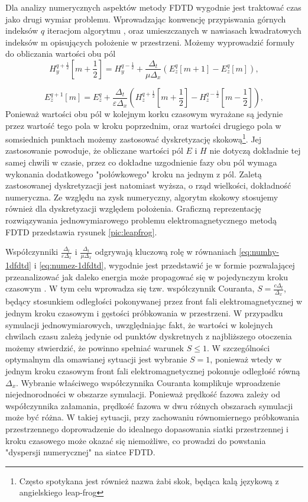 Dla analizy numerycznych aspektów metody FDTD wygodnie jest traktować czas jako drugi wymiar problemu. Wprowadzając konwencję przypiswania górnych indeksów $q$  iteracjom algorytmu , oraz umieszczanych w nawiasach kwadratowych indeksów m opisujących położenie w przestrzeni. Możemy wyprowadzić formuły do obliczania wartości obu pól
\begin{equation}
H_y^{q+\frac{1}{2}}[m+\frac{1}{2}]=H_y^{q-\frac{1}{2}}+\frac{\Delta_t}{\mu \Delta_x}(E^q_z[m+1]-E^q_z[m]),
\label{eq:numhy-1dfdtd}
\end{equation}

\begin{equation}
E_z^{q+1}[m]=E_z^{q}+\frac{\Delta_t}{\varepsilon \Delta_x}(H^{q+\frac{1}{2}}_z[m+\frac{1}{2}]-H^{q-\frac{1}{2}}_z[m-\frac{1}{2}]),
\label{eq:numez-1dfdtd}
\end{equation}
 Ponieważ wartości obu pól w kolejnym korku czasowym wyrażane są jedynie przez wartość tego pola w kroku poprzednim, oraz wartości drugiego pola w somsiednich punktach możemy zastosować dyskretyzację skokową\footnote{Często spotykana jest również nazwa żabi skok, będąca kalą językową z angielskiego leap-frog}. Jej zastosowanie powoduje, że obliczane wartości pól $E$ i $H$ nie dotyczą dokładnie tej samej chwili w czasie, przez co dokładne uzgodnienie fazy obu pól wymaga wykonania dodatkowego "połówkowego" kroku na jednym z pól. Zaletą zastosowanej dyskretyzacji jest natomiast wyższa, o rząd wielkości, dokładność numeryczna. Ze względu na zysk numeryczny, algorytm skokowy stosujemy również dla dyskretyzacji względem położenia. Graficzną reprezentację rozwiązywania jednowymiarowego problemu elektromagnetycznego metodą FDTD przedstawia rysunek \ref{pic:leapfrog}.

Współczynniki $\frac{\Delta_t}{\varepsilon \Delta_x}$ i $\frac{\Delta_t}{\mu \Delta_x}$ odgrywają kluczową rolę w równaniach \ref{eq:numhy-1dfdtd} i \ref{eq:numez-1dfdtd}, wygodnie jest przedstawić je w formie pozwalającej przeanalizować jak daleko energia może propagować się w pojedynczym kroku czasowym \cite{understanding-fdtd}. W tym celu wprowadza się tzw. współczynnik Couranta, $S=\frac{c \Delta_t}{\Delta_x}$, będący stosunkiem odległości pokonywanej przez front fali elektromagnetycznej w jednym kroku czasowym i gęstości próbkowania w przestrzeni. W przypadku symulacji jednowymiarowych, uwzględniając fakt, że wartości w kolejnych chwilach czasu zależą jedynie od punktów dyskretnych z najbliższego otoczenia możemy stwierdzić, że powinno spełniać warunek $S\le1$. W szczególności optymalnym dla omawianej sytuacji jest wybranie $S=1$, ponieważ wtedy w jednym kroku czasowym front fali elektromagnetycznej pokonuje odległość równą $\Delta_x$. Wybranie właściwego współczynnika Couranta komplikuje wproadzenie niejednorodności w obszarze symulacji. Ponieważ prędkość fazowa zależy od współczynnika załamania, prędkość fazowa w dwu różnych obszarach symulacji może być różna. W takiej sytuacji, przy zachowaniu równomiernego próbkowania przestrzennego doprowadzenie do idealnego dopasowania siatki przestrzennej i kroku czasowego może okazać się niemożliwe, co prowadzi do powstania "dyspersji numerycznej" na siatce FDTD. 

